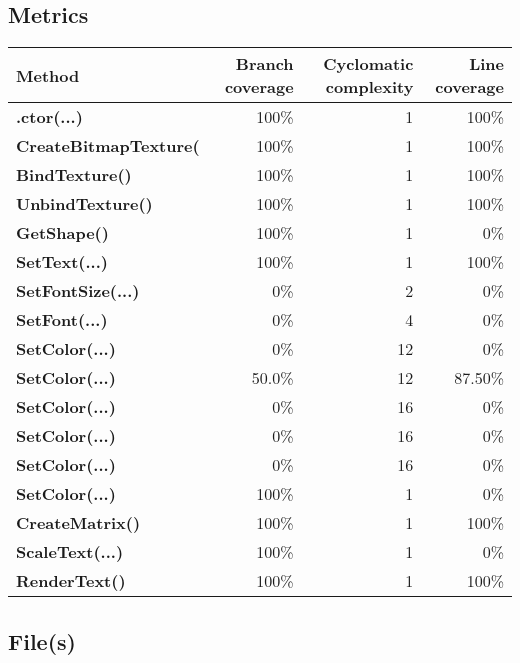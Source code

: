 \documentclass[a4paper,landscape,10pt]{article}
\begin{document}
\subsection{Metrics}
\begin{longtable}[l]{|l|r|r|r|}
\hline
\textbf{Method} & \textbf{Branch coverage} & \textbf{Cyclomatic complexity} & \textbf{Line coverage}\\
\hline
\textbf{.ctor(...)} & 100\% & 1 & 100\%\\
\hline
\textbf{CreateBitmapTexture(} & 100\% & 1 & 100\%\\
\hline
\textbf{BindTexture()} & 100\% & 1 & 100\%\\
\hline
\textbf{UnbindTexture()} & 100\% & 1 & 100\%\\
\hline
\textbf{GetShape()} & 100\% & 1 & 0\%\\
\hline
\textbf{SetText(...)} & 100\% & 1 & 100\%\\
\hline
\textbf{SetFontSize(...)} & 0\% & 2 & 0\%\\
\hline
\textbf{SetFont(...)} & 0\% & 4 & 0\%\\
\hline
\textbf{SetColor(...)} & 0\% & 12 & 0\%\\
\hline
\textbf{SetColor(...)} & 50.0\% & 12 & 87.50\%\\
\hline
\textbf{SetColor(...)} & 0\% & 16 & 0\%\\
\hline
\textbf{SetColor(...)} & 0\% & 16 & 0\%\\
\hline
\textbf{SetColor(...)} & 0\% & 16 & 0\%\\
\hline
\textbf{SetColor(...)} & 100\% & 1 & 0\%\\
\hline
\textbf{CreateMatrix()} & 100\% & 1 & 100\%\\
\hline
\textbf{ScaleText(...)} & 100\% & 1 & 0\%\\
\hline
\textbf{RenderText()} & 100\% & 1 & 100\%\\
\hline
\end{longtable}
\subsection{File(s)}
\end{document}
